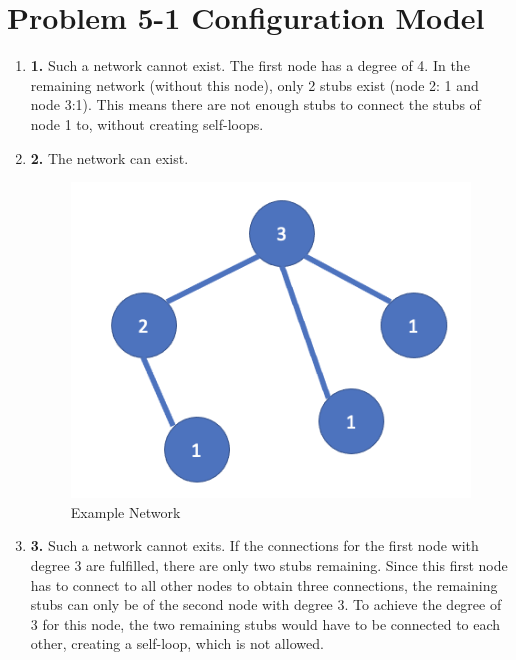 \section{Problem 5-1 Configuration Model}



\begin{enumerate}
	\item \textbf{1.} Such a network cannot exist. The first node has a degree of 4.  In the remaining network (without this node), only 2 stubs exist (node 2: 1 and node 3:1).  This means there are not enough stubs to connect the stubs of node 1 to,  without creating self-loops.
	
	\item \textbf{2. } The network can exist.
	\begin{figure}[h]
		\centering
		\includegraphics[width=0.9\linewidth]{images/pic1.png}
		\caption{Example Network}
		\label{distribution}
	\end{figure}
	
	\item \textbf{3.} Such a network cannot exits.  If the connections for the first node with degree 3 are fulfilled,  there are only two stubs remaining.  Since this first node has to connect to all other nodes to obtain three connections,  the remaining stubs can only be of the second node with degree 3.  To achieve the degree of 3 for this node,  the two remaining stubs would have to be connected to each other,  creating a self-loop,  which is not allowed.
\end{enumerate}